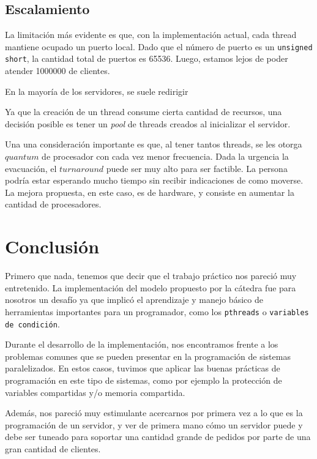 \documentclass[11pt, a4paper, twoside]{article}
\begin{document}
\subsection{Escalamiento}
La limitación más evidente es que, con la implementación actual, cada thread mantiene ocupado un puerto local. Dado que el número de puerto es un \texttt{unsigned short}, la cantidad total de puertos es 65536. Luego, estamos lejos de poder atender 1000000 de clientes.

En la mayoría de los servidores, se suele redirigir %

Ya que la creación de un thread consume cierta cantidad de recursos, una decisión posible es tener un \textit{pool} de threads creados al inicializar el servidor.

Una una consideración importante es que, al tener tantos threads, se les otorga $quantum$ de procesador con cada vez menor frecuencia. Dada la urgencia la evacuación, el $turnaround$ puede ser muy alto para ser factible. La persona podría estar esperando mucho tiempo sin recibir indicaciones de como moverse. La mejora propuesta, en este caso, es de hardware, y consiste en aumentar la cantidad de procesadores.



\newpage
{}
\section{Conclusión}


Primero que nada, tenemos que decir que el trabajo práctico nos pareció muy entretenido. La implementación del modelo propuesto por la cátedra fue para nosotros un desafío ya que implicó el aprendizaje y manejo básico de herramientas importantes para un programador, como los \texttt{pthreads} o \texttt{variables de condición}.

Durante el desarrollo de la implementación, nos encontramos frente a los problemas comunes que se pueden
presentar en la programación de sistemas paralelizados. En estos casos, tuvimos que aplicar las buenas prácticas de programación en este tipo de sistemas, como por ejemplo la protección de variables compartidas y/o memoria compartida.

Además, nos pareció muy estimulante acercarnos por primera vez a lo que es la programación de un servidor, y ver
de primera mano cómo un servidor puede y debe ser tuneado para soportar una cantidad grande de pedidos por parte de una gran cantidad de clientes.
\end{document}
